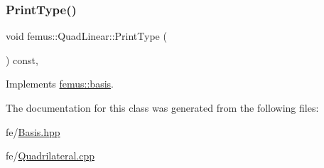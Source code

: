 \subsubsection{\texorpdfstring{Print\+Type()}{PrintType()}}
{\footnotesize\ttfamily void femus\+::\+Quad\+Linear\+::\+Print\+Type (\begin{DoxyParamCaption}{ }\end{DoxyParamCaption}) const\hspace{0.3cm}{\ttfamily [inline]}, {\ttfamily [virtual]}}



Implements \mbox{\hyperlink{classfemus_1_1basis_abbae7bf8f31ec5793c911bc6d4ea0572}{femus\+::basis}}.



The documentation for this class was generated from the following files\+:\begin{DoxyCompactItemize}
\item 
fe/\mbox{\hyperlink{_basis_8hpp}{Basis.\+hpp}}\item 
fe/\mbox{\hyperlink{_quadrilateral_8cpp}{Quadrilateral.\+cpp}}\end{DoxyCompactItemize}
